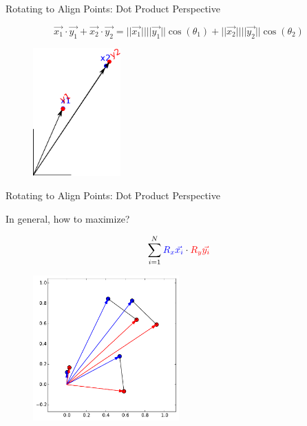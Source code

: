 \documentclass{beamer}
\begin{document}
\begin{frame}{Rotating to Align Points: Dot Product Perspective}

\[ \vec{x_1} \cdot \vec{y_1} + \vec{x_2} \cdot \vec{y_2} = ||\vec{x_1}|| ||\vec{y_1}|| \cos(\theta_1) + ||\vec{x_2}|| ||\vec{y_2}|| \cos(\theta_2) \]

\begin{figure}[t]
	\centering
    \includegraphics[width=0.3\textwidth]{PointsAlign2Rot.pdf}
\end{figure}


\end{frame}


\begin{frame}{Rotating to Align Points: Dot Product Perspective}

In general, how to maximize?

\[ \sum_{i = 1}^N \textcolor{blue}{R_x \vec{x_i}} \cdot \textcolor{red}{R_y \vec{y_i}} \]
\begin{figure}[t]
	\centering
    \includegraphics[width=0.5\textwidth]{2DProcrustes1.pdf}
\end{figure}


\end{frame}
\end{document}
